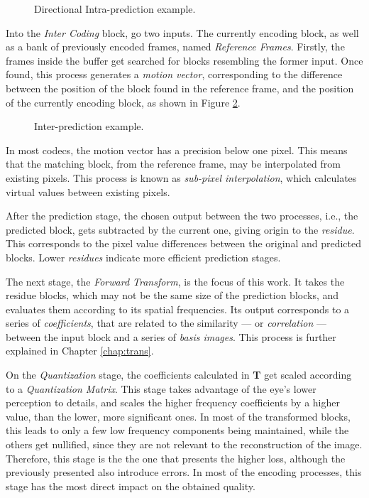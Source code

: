 \begin{figure}[!htbp]
    \centering
    
    \caption{Directional Intra-prediction example.}
    \label{fig:intraex}
\end{figure}

Into the \emph{Inter Coding} block, go two inputs. The currently encoding block, as well as a bank of previously encoded frames, named \emph{Reference Frames}. Firstly, the frames inside the buffer get searched for blocks resembling the former input. Once found, this process generates a \emph{motion vector}, corresponding to the difference between the position of the block found in the reference frame, and the position of the currently encoding block, as shown in Figure \ref{fig:interex}.

\begin{figure}[!htbp]
    \centering
    
    \caption{Inter-prediction example.}
    \label{fig:interex}
\end{figure}

In most codecs, the motion vector has a precision below one pixel. This means that the matching block, from the reference frame, may be interpolated from existing pixels. This process is known as \emph{sub-pixel interpolation}, which calculates virtual values between existing pixels. 

After the prediction stage, the chosen output between the two processes, i.e., the predicted block, gets subtracted by the current one, giving origin to the \emph{residue}. This corresponds to the pixel value differences between the original and predicted blocks. Lower \emph{residues} indicate more efficient prediction stages.

The next stage, the \emph{Forward Transform}, is the focus of this work. It takes the residue blocks, which may not be the same size of the prediction blocks, and evaluates them according to its spatial frequencies. Its output corresponds to a series of \emph{coefficients}, that are related to the similarity --- or \emph{correlation} --- between the input block and a series of \emph{basis images}. This process is further explained in Chapter \ref{chap:trans}.

On the \emph{Quantization} stage, the coefficients calculated in \textbf{T} get scaled according to a \emph{Quantization Matrix}. This stage takes advantage of the eye's lower perception to details, and scales the higher frequency coefficients by a higher value, than the lower, more significant ones. In most of the transformed blocks, this leads to only a few low frequency components being maintained, while the others get nullified, since they are not relevant to the reconstruction of the image. Therefore, this stage is the the one that presents the higher loss, although the previously presented also introduce errors. In most of the encoding processes, this stage has the most direct impact on the obtained quality.

